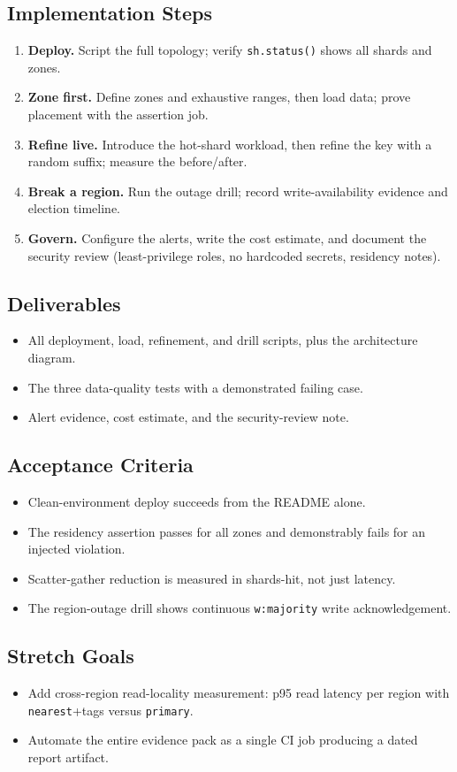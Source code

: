 \subsection*{Implementation Steps}
\begin{enumerate}
    \item \textbf{Deploy.} Script the full topology; verify \texttt{sh.status()} shows all shards and zones.
    \item \textbf{Zone first.} Define zones and exhaustive ranges, then load data; prove placement with the assertion job.
    \item \textbf{Refine live.} Introduce the hot-shard workload, then refine the key with a random suffix; measure the before/after.
    \item \textbf{Break a region.} Run the outage drill; record write-availability evidence and election timeline.
    \item \textbf{Govern.} Configure the alerts, write the cost estimate, and document the security review (least-privilege roles, no hardcoded secrets, residency notes).
\end{enumerate}

\subsection*{Deliverables}
\begin{itemize}
    \item All deployment, load, refinement, and drill scripts, plus the architecture diagram.
    \item The three data-quality tests with a demonstrated failing case.
    \item Alert evidence, cost estimate, and the security-review note.
\end{itemize}

\subsection*{Acceptance Criteria}
\begin{itemize}
    \item Clean-environment deploy succeeds from the README alone.
    \item The residency assertion passes for all zones and demonstrably fails for an injected violation.
    \item Scatter-gather reduction is measured in shards-hit, not just latency.
    \item The region-outage drill shows continuous \texttt{w:majority} write acknowledgement.
\end{itemize}

\subsection*{Stretch Goals}
\begin{itemize}
    \item Add cross-region read-locality measurement: p95 read latency per region with \texttt{nearest}+tags versus \texttt{primary}.
    \item Automate the entire evidence pack as a single CI job producing a dated report artifact.
\end{itemize}
